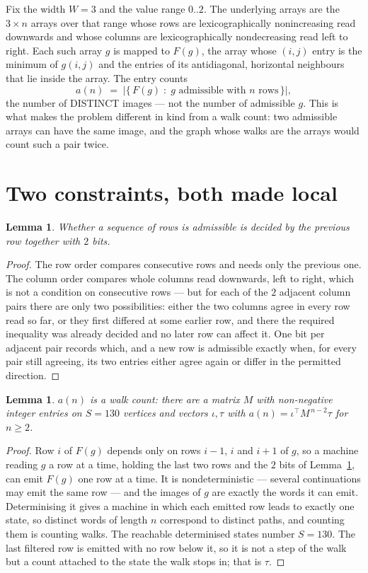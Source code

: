 \documentclass[11pt,a4paper]{article}
\theoremstyle{plain}
\newtheorem{lemma}[theorem]{Lemma}
\theoremstyle{definition}
\begin{document}
Fix the width $W=3$ and the value range $0..2$. The underlying arrays are the
$3\times n$ arrays over that range whose rows are lexicographically nonincreasing read downwards
and whose columns are lexicographically nondecreasing read left to right. Each such array $g$
is mapped to $F(g)$, the array whose $(i,j)$ entry is the minimum of $g(i,j)$ and the entries
of its antidiagonal, horizontal neighbours that lie inside the array. The entry counts
\[
a(n)\;=\;\bigl|\{\,F(g)\;:\;g\text{ admissible with }n\text{ rows}\,\}\bigr|,
\]
the number of DISTINCT images --- not the number of admissible $g$. This is what makes the
problem different in kind from a walk count: two admissible arrays can have the same image, and
the graph whose walks are the arrays would count such a pair twice.

\section{Two constraints, both made local}

\begin{lemma}\label{lem:local}
Whether a sequence of rows is admissible is decided by the previous row together with
$2$ bits.
\end{lemma}

\begin{proof}
The row order compares consecutive rows and needs only the previous one. The column order
compares whole columns read downwards, left to right, which is not a condition on consecutive
rows --- but for each of the $2$ adjacent column pairs there are only two possibilities:
either the two columns agree in every row read so far, or they first differed at some earlier
row, and there the required inequality was already decided and no later row can affect it. One
bit per adjacent pair records which, and a new row is admissible exactly when, for every pair
still agreeing, its two entries either agree again or differ in the permitted direction.
\end{proof}

\begin{lemma}\label{lem:det}
$a(n)$ is a walk count: there are a matrix $M$ with non-negative integer entries on $S=130$
vertices and vectors $\iota,\tau$ with $a(n)=\iota^{\!\top}M^{\,n-2}\tau$ for $n\ge2$.
\end{lemma}

\begin{proof}
Row $i$ of $F(g)$ depends only on rows $i-1$, $i$ and $i+1$ of $g$, so a machine reading $g$ a
row at a time, holding the last two rows and the $2$ bits of Lemma~\ref{lem:local}, can
emit $F(g)$ one row at a time. It is nondeterministic --- several continuations may emit the
same row --- and the images of $g$ are exactly the words it can emit. Determinising it gives a
machine in which each emitted row leads to exactly one state, so distinct words of length $n$
correspond to distinct paths, and counting them is counting walks. The reachable determinised
states number $S=130$. The last filtered row is emitted with no row below it, so it is not a
step of the walk but a count attached to the state the walk stops in; that is $\tau$.
\end{proof}
\end{document}
